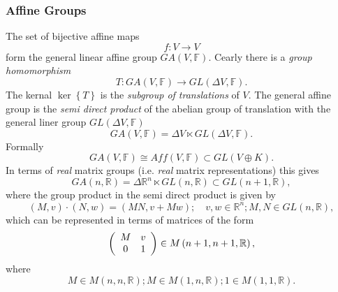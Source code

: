 \documentclass[aps,preprint]{revtex4}%
\begin{document}
\subsubsection{Affine Groups}

The set of bijective affine maps
\begin{equation}
f:V\rightarrow V
\end{equation}
form the general linear affine group $GA\left(  V,\mathbb{F}\right)  .$ Cearly
there is a \emph{group homomorphism}
\begin{equation}
T:GA\left(  V,\mathbb{F}\right)  \rightarrow GL\left(  \Delta V,\mathbb{F}%
\right)  .
\end{equation}
The kernal $\ker\left\{  T\right\}  $ is the \emph{subgroup of translations}
of $V.$ The general affine group is the \emph{semi direct product} of the
abelian group of translation with the general liner group $GL\left(  \Delta
V,\mathbb{F}\right)  $
\begin{equation}
GA\left(  V,\mathbb{F}\right)  =\Delta V\ltimes GL\left(  \Delta
V,\mathbb{F}\right)  .
\end{equation}
Formally
\begin{equation}
GA\left(  V,\mathbb{F}\right)  \cong Aff\left(  V,\mathbb{F}\right)  \subset
GL\left(  V\oplus K\right)  .
\end{equation}
In terms of \emph{real} matrix groups (i.e. \emph{real} matrix
representations) this gives
\begin{equation}
GA\left(  n,\mathbb{R}\right)  =\Delta\mathbb{R}^{n}\ltimes GL\left(
n,\mathbb{R}\right)  \subset GL\left(  n+1,\mathbb{R}\right)  ,
\end{equation}
where the group product in the semi direct product is given by
\begin{equation}
\left(  M,v\right)  \cdot\left(  N,w\right)  =\left(  MN,v+Mw\right)  ;\quad
v,w\in\mathbb{R}^{n};M,N\in GL\left(  n,\mathbb{R}\right)  ,
\end{equation}
which can be represented in terms of matrices of the form
\begin{equation}
\left(
\begin{array}
[c]{cc}%
M & v\\
0 & 1
\end{array}
\right)  \in M\left(  n+1,n+1,\mathbb{R}\right)  ,
\end{equation}
where
\begin{equation}
M\in M\left(  n,n,\mathbb{R}\right)  ;M\in M\left(  1,n,\mathbb{R}\right)
;1\in M\left(  1,1,\mathbb{R}\right)  .
\end{equation}
\end{document}
